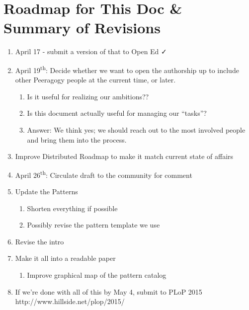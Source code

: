 \section{Roadmap for This Doc \& Summary of Revisions}

\begin{enumerate}
\item April 17 - submit a version of that to Open Ed ✓
\item April 19\textsuperscript{th}: Decide whether we want to open the authorship up to include other Peeragogy people at the current time, or later. 
\begin{enumerate}
\item Is it useful for realizing our ambitions??
\item Is this document actually useful for managing our ``tasks''?
\item Answer: We think yes; we should reach out to the most involved people and bring them into the process.
\end{enumerate}
\item Improve Distributed Roadmap to make it match current state of affairs 
\item April 26\textsuperscript{th}: Circulate draft to the community for comment
\item Update the Patterns
\begin{enumerate}
\item Shorten everything if possible
\item Possibly revise the pattern template we use
\end{enumerate}
\item Revise the intro
\item Make it all into a readable paper
\begin{enumerate}
\item Improve graphical map of the pattern catalog
\end{enumerate}
\item If we're done with all of this by May 4, submit to PLoP 2015 http://www.hillside.net/plop/2015/
\end{enumerate}